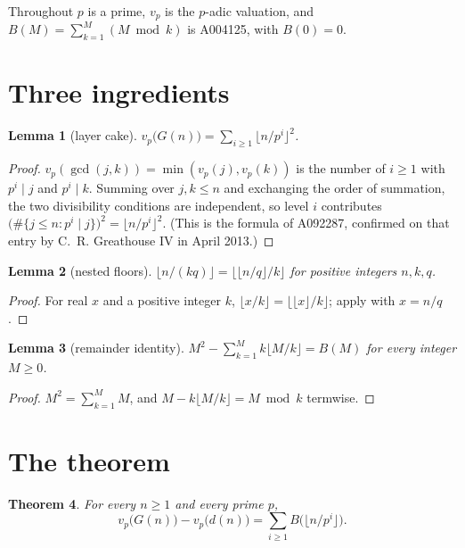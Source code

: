 \documentclass[11pt,a4paper]{article}
\theoremstyle{plain}
\newtheorem{theorem}{Theorem}
\newtheorem{lemma}[theorem]{Lemma}
\theoremstyle{definition}
\begin{document}
Throughout $p$ is a prime, $v_{p}$ is the $p$-adic valuation, and
$B(M)=\sum_{k=1}^{M}(M\bmod k)$ is A004125, with $B(0)=0$.

\section{Three ingredients}

\begin{lemma}[layer cake]\label{lem:num}
$\displaystyle v_{p}\bigl(G(n)\bigr)=\sum_{i\ge1}\lfloor n/p^{i}\rfloor^{2}$.
\end{lemma}

\begin{proof}
$v_{p}(\gcd(j,k))=\min(v_{p}(j),v_{p}(k))$ is the number of $i\ge1$ with $p^{i}\mid j$ and
$p^{i}\mid k$. Summing over $j,k\le n$ and exchanging the order of summation, the two
divisibility conditions are independent, so level $i$ contributes
$\bigl(\#\{j\le n:p^{i}\mid j\}\bigr)^{2}=\lfloor n/p^{i}\rfloor^{2}$. (This is the formula
of A092287, confirmed on that entry by C.~R. Greathouse IV in April 2013.)
\end{proof}

\begin{lemma}[nested floors]\label{lem:floor}
$\lfloor n/(kq)\rfloor=\lfloor\lfloor n/q\rfloor/k\rfloor$ for positive integers $n,k,q$.
\end{lemma}

\begin{proof}
For real $x$ and a positive integer $k$, $\lfloor x/k\rfloor=\lfloor\lfloor x\rfloor/k
\rfloor$; apply with $x=n/q$.
\end{proof}

\begin{lemma}[remainder identity]\label{lem:rem}
$\displaystyle M^{2}-\sum_{k=1}^{M}k\lfloor M/k\rfloor=B(M)$ for every integer $M\ge0$.
\end{lemma}

\begin{proof}
$M^{2}=\sum_{k=1}^{M}M$, and $M-k\lfloor M/k\rfloor=M\bmod k$ termwise.
\end{proof}

\section{The theorem}

\begin{theorem}\label{thm:main}
For every $n\ge1$ and every prime $p$,
\[
  v_{p}\bigl(G(n)\bigr)-v_{p}\bigl(d(n)\bigr)=\sum_{i\ge1}B\bigl(\lfloor n/p^{i}\rfloor
  \bigr).
\]
\end{theorem}
\end{document}
